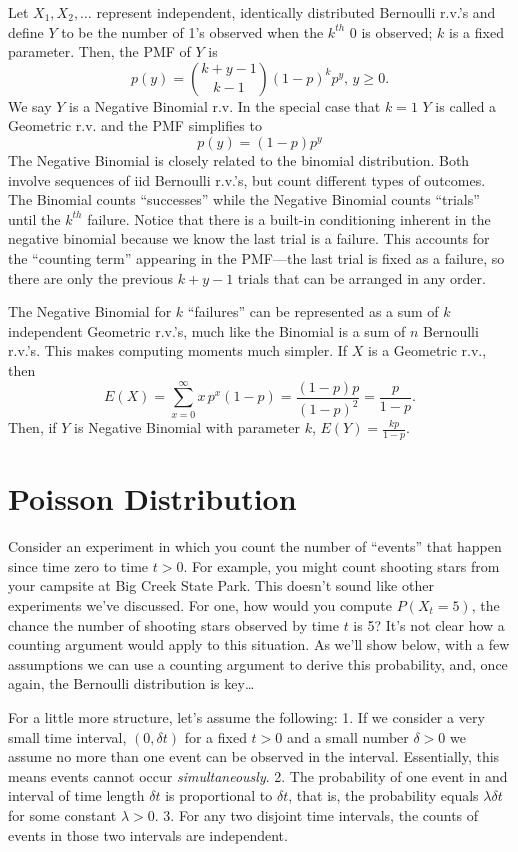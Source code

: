 \documentclass[]{book}
\begin{document}
Let \(X_1, X_2, \ldots\) represent independent, identically distributed
Bernoulli r.v.'s and define \(Y\) to be the number of 1's observed when
the \(k^{th}\) 0 is observed; \(k\) is a fixed parameter. Then, the PMF
of \(Y\) is \[p(y) = {k + y - 1 \choose k-1}(1-p)^kp^{y}, \, y\geq 0.\]
We say \(Y\) is a Negative Binomial r.v. In the special case that
\(k=1\) \(Y\) is called a Geometric r.v. and the PMF simplifies to
\[p(y) = (1-p)p^y\] The Negative Binomial is closely related to the
binomial distribution. Both involve sequences of iid Bernoulli r.v.'s,
but count different types of outcomes. The Binomial counts ``successes''
while the Negative Binomial counts ``trials'' until the \(k^{th}\)
failure. Notice that there is a built-in conditioning inherent in the
negative binomial because we know the last trial is a failure. This
accounts for the ``counting term'' appearing in the PMF---the last trial
is fixed as a failure, so there are only the previous \(k+y - 1\) trials
that can be arranged in any order.

The Negative Binomial for \(k\) ``failures'' can be represented as a sum
of \(k\) independent Geometric r.v.'s, much like the Binomial is a sum
of \(n\) Bernoulli r.v.'s. This makes computing moments much simpler. If
\(X\) is a Geometric r.v., then
\[E(X) = \sum_{x=0}^\infty x \, p^x (1-p) = \frac{(1-p)p}{(1-p)^2} = \frac{p}{1-p}.\]
Then, if \(Y\) is Negative Binomial with parameter \(k\),
\(E(Y) = \frac{kp}{1-p}\).

\section{Poisson Distribution}\label{poisson-distribution}

Consider an experiment in which you count the number of ``events'' that
happen since time zero to time \(t>0\). For example, you might count
shooting stars from your campsite at Big Creek State Park. This doesn't
sound like other experiments we've discussed. For one, how would you
compute \(P(X_t = 5)\), the chance the number of shooting stars observed
by time \(t\) is 5? It's not clear how a counting argument would apply
to this situation. As we'll show below, with a few assumptions we can
use a counting argument to derive this probability, and, once again, the
Bernoulli distribution is key\ldots{}

For a little more structure, let's assume the following: 1. If we
consider a very small time interval, \((0, \delta t)\) for a fixed
\(t>0\) and a small number \(\delta>0\) we assume no more than one event
can be observed in the interval. Essentially, this means events cannot
occur \emph{simultaneously}. 2. The probability of one event in and
interval of time length \(\delta t\) is proportional to \(\delta t\),
that is, the probability equals \(\lambda \delta t\) for some constant
\(\lambda >0\). 3. For any two disjoint time intervals, the counts of
events in those two intervals are independent.
\end{document}
